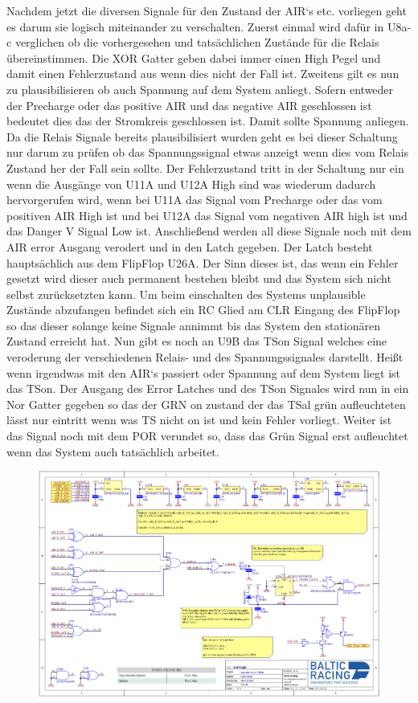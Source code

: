 Nachdem jetzt die diversen Signale für den Zustand der AIR`s etc. vorliegen geht es darum sie logisch miteinander zu verschalten. Zuerst einmal wird dafür in U8a-c verglichen ob die vorhergesehen und tatsächlichen Zustände für die Relais übereinstimmen. Die XOR Gatter geben dabei immer einen High Pegel und damit einen Fehlerzustand aus wenn dies nicht der Fall ist. Zweitens gilt es nun zu plausibilisieren ob auch Spannung auf dem System anliegt. Sofern entweder der Precharge oder das positive AIR und das negative AIR geschlossen ist bedeutet dies das der Stromkreis geschlossen ist. Damit sollte Spannung anliegen. Da die Relais Signale bereits plausibilisiert wurden geht es bei dieser Schaltung nur darum zu prüfen ob das Spannungssignal etwas anzeigt wenn dies vom Relais Zustand her der Fall sein sollte. Der Fehlerzustand tritt in der Schaltung nur ein wenn die Ausgänge von U11A und U12A High sind was wiederum dadurch hervorgerufen wird, wenn bei U11A das Signal vom Precharge oder das vom positiven AIR High ist und bei U12A das Signal vom negativen AIR high ist und das Danger V Signal Low ist. Anschließend werden all diese Signale noch mit dem AIR error Ausgang verodert und in den Latch gegeben. Der Latch besteht hauptsächlich aus dem FlipFlop U26A. Der Sinn dieses ist, das wenn ein Fehler gesetzt wird dieser auch permanent bestehen bleibt und das System sich nicht selbst zurücksetzten kann. Um beim einschalten des Systems unplausible Zustände abzufangen befindet sich ein RC Glied am CLR Eingang des FlipFlop so das dieser solange keine Signale annimmt bis das System den stationären Zustand erreicht hat. Nun gibt es noch an U9B das TSon Signal welches eine veroderung der verschiedenen Relais- und des Spannungssignales darstellt. Heißt wenn irgendwas mit den AIR`s passiert oder Spannung auf dem System liegt ist das TSon. Der Ausgang des Error Latches und des TSon Signales wird nun in ein Nor Gatter gegeben so das der GRN on zustand der das TSal grün aufleuchteten lässt nur eintritt wenn was TS nicht on ist und kein Fehler vorliegt. Weiter ist das Signal noch mit dem POR verundet so, dass das Grün Signal erst aufleuchtet wenn das System auch tatsächlich arbeitet.

\begin{figure}
	\centering
	\includegraphics[width=0.7\linewidth]{"bilder/TSAL Logik AMS Master"}
	\caption{}
	\label{fig:tsal-logik-ams-master}
\end{figure}

